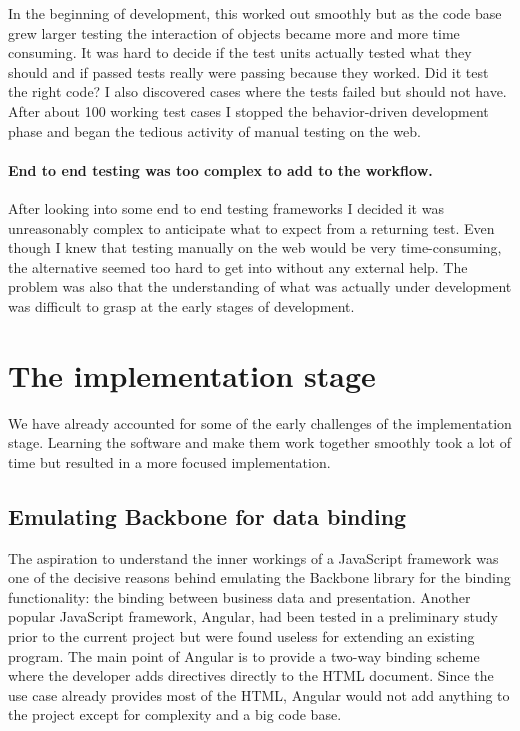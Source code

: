 \documentclass[english]{ifimaster}
\begin{document}
In the beginning of development, this worked out smoothly but as the code base grew larger testing the interaction of objects became more and more time consuming. It was hard to decide if the test units actually tested what they should and if passed tests really were passing because they worked. Did it test the right code? I also discovered cases where the tests failed but should not have. After about 100 working test cases I stopped the behavior-driven development phase and began the tedious activity of manual testing on the web.

\paragraph{End to end testing was too complex to add to the workflow.} After looking into some end to end testing frameworks I decided it was unreasonably complex to anticipate what to expect from a returning test. Even though I knew that testing manually on the web would be very time-consuming, the alternative seemed too hard to get into without any external help. The problem was also that the understanding of what was actually under development was difficult to grasp at the early stages of development.

\section{The implementation stage}
We have already accounted for some of the early challenges of the implementation stage. Learning the software and make them work together smoothly took a lot of time but resulted in a more focused implementation. 

\subsection{Emulating Backbone for data binding}
The aspiration to understand the inner workings of a JavaScript framework was one of the decisive reasons behind emulating the Backbone library for the binding functionality: the binding between business data and presentation. Another popular JavaScript framework, Angular, had been tested in a preliminary study prior to the current project but were found useless for extending an existing program. The main point of Angular is to provide a two-way binding scheme where the developer adds directives directly to the HTML document. Since the use case already provides most of the HTML, Angular would not add anything to the project except for complexity and a big code base.
\end{document}
